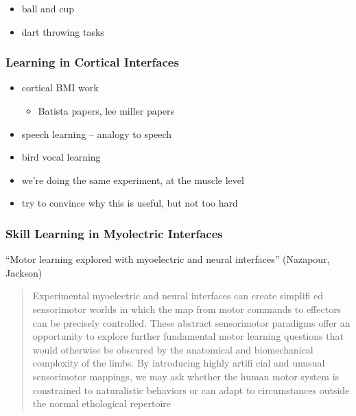 \documentclass[../main.tex]{subfiles}
\begin{document}
{{{{{{{{{{{\begin{itemize}
  \begin{itemize}
  \tightlist
  \item
    ball and cup
  \item
    dart throwing tasks
  \end{itemize}
\end{itemize}

\subsubsection{Learning in Cortical
Interfaces}\label{learning-in-cortical-interfaces}

\begin{itemize}
\item
  cortical BMI work

  \begin{itemize}
  \tightlist
  \item
    Batista papers, lee miller papers
  \end{itemize}
\item
  speech learning -- analogy to speech
\item
  bird vocal learning
\item
  we're doing the same experiment, at the muscle level
\item
  try to convince why this is useful, but not too hard
\end{itemize}

\subsubsection{Skill Learning in Myolectric
Interfaces}\label{skill-learning-in-myolectric-interfaces}

``Motor learning explored with myoelectric and neural interfaces''
(Nazapour, Jackson)

\begin{quote}
Experimental myoelectric and neural interfaces can create simplifi ed
sensorimotor worlds in which the map from motor commands to effectors
can be precisely controlled. These abstract sensorimotor paradigms offer
an opportunity to explore further fundamental motor learning questions
that would otherwise be obscured by the anatomical and biomechanical
complexity of the limbs. By introducing highly artifi cial and unusual
sensorimotor mappings, we may ask whether the human motor system is
constrained to naturalistic behaviors or can adapt to circumstances
outside the normal ethological repertoire
\end{quote}

}}}}}}}}}}}
\end{document}

